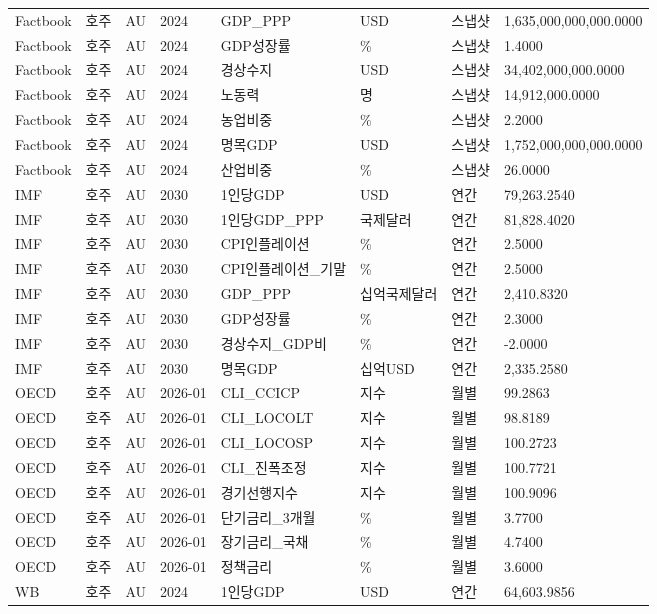 \documentclass[11pt,a4paper]{article}
\begin{document}
\begin{longtable}{llllllll}
Factbook & 호주 & AU & 2024 & GDP\_PPP & USD & 스냅샷 & 1,635,000,000,000.0000 \\
Factbook & 호주 & AU & 2024 & GDP성장률 & \% & 스냅샷 & 1.4000 \\
Factbook & 호주 & AU & 2024 & 경상수지 & USD & 스냅샷 & 34,402,000,000.0000 \\
Factbook & 호주 & AU & 2024 & 노동력 & 명 & 스냅샷 & 14,912,000.0000 \\
Factbook & 호주 & AU & 2024 & 농업비중 & \% & 스냅샷 & 2.2000 \\
Factbook & 호주 & AU & 2024 & 명목GDP & USD & 스냅샷 & 1,752,000,000,000.0000 \\
Factbook & 호주 & AU & 2024 & 산업비중 & \% & 스냅샷 & 26.0000 \\
IMF & 호주 & AU & 2030 & 1인당GDP & USD & 연간 & 79,263.2540 \\
IMF & 호주 & AU & 2030 & 1인당GDP\_PPP & 국제달러 & 연간 & 81,828.4020 \\
IMF & 호주 & AU & 2030 & CPI인플레이션 & \% & 연간 & 2.5000 \\
IMF & 호주 & AU & 2030 & CPI인플레이션\_기말 & \% & 연간 & 2.5000 \\
IMF & 호주 & AU & 2030 & GDP\_PPP & 십억국제달러 & 연간 & 2,410.8320 \\
IMF & 호주 & AU & 2030 & GDP성장률 & \% & 연간 & 2.3000 \\
IMF & 호주 & AU & 2030 & 경상수지\_GDP비 & \% & 연간 & -2.0000 \\
IMF & 호주 & AU & 2030 & 명목GDP & 십억USD & 연간 & 2,335.2580 \\
OECD & 호주 & AU & 2026-01 & CLI\_CCICP & 지수 & 월별 & 99.2863 \\
OECD & 호주 & AU & 2026-01 & CLI\_LOCOLT & 지수 & 월별 & 98.8189 \\
OECD & 호주 & AU & 2026-01 & CLI\_LOCOSP & 지수 & 월별 & 100.2723 \\
OECD & 호주 & AU & 2026-01 & CLI\_진폭조정 & 지수 & 월별 & 100.7721 \\
OECD & 호주 & AU & 2026-01 & 경기선행지수 & 지수 & 월별 & 100.9096 \\
OECD & 호주 & AU & 2026-01 & 단기금리\_3개월 & \% & 월별 & 3.7700 \\
OECD & 호주 & AU & 2026-01 & 장기금리\_국채 & \% & 월별 & 4.7400 \\
OECD & 호주 & AU & 2026-01 & 정책금리 & \% & 월별 & 3.6000 \\
WB & 호주 & AU & 2024 & 1인당GDP & USD & 연간 & 64,603.9856 \\

\end{longtable}
\end{document}

